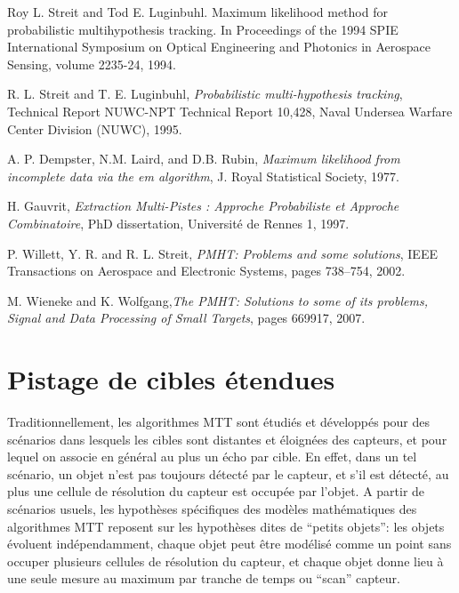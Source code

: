\documentclass[10pt,french,a4paper]{report}
\begin{document}
\begin{thebibliography}{9}
Roy L. Streit and Tod E. Luginbuhl. Maximum likelihood method for probabilistic multihypothesis tracking. In Proceedings of the 1994 SPIE International Symposium on Optical Engineering and Photonics in Aerospace Sensing, volume 2235-24, 1994.

R. L. Streit and T. E. Luginbuhl, \emph{Probabilistic multi-hypothesis tracking}, Technical Report NUWC-NPT Technical Report 10,428, Naval Undersea Warfare Center Division (NUWC), 1995.

A. P. Dempster, N.M. Laird, and D.B. Rubin, \emph{Maximum likelihood from incomplete data via the em algorithm}, J. Royal Statistical Society, 1977.

H. Gauvrit, \emph{Extraction Multi-Pistes : Approche Probabiliste et Approche Combinatoire}, PhD dissertation, Université de Rennes 1, 1997.

P. Willett, Y. R. and R. L. Streit, \emph{PMHT: Problems and some solutions},
IEEE Transactions on Aerospace and Electronic Systems, pages 738--754, 2002.

M. Wieneke and K. Wolfgang,\emph{The PMHT: Solutions to some of its problems, Signal and Data Processing of Small Targets}, pages 669917, 2007.
	 	  \end{thebibliography}


\section{Pistage de cibles étendues}
 
Traditionnellement, les algorithmes \ac{MTT} sont étudiés et développés pour des scénarios dans lesquels les cibles sont distantes et éloignées des capteurs, et pour lequel on associe en général au plus un écho par cible. En effet, dans un tel
scénario, un objet n'est pas toujours détecté par le capteur, et s'il est détecté, au plus une cellule de résolution du capteur est occupée par l'objet. A partir de scénarios usuels, les hypothèses spécifiques
des modèles mathématiques des algorithmes \ac{MTT} reposent sur les hypothèses dites de ``petits objets'': les objets évoluent indépendamment, chaque objet peut être modélisé comme un point sans occuper plusieurs cellules de résolution du capteur, et chaque objet donne lieu à une seule mesure au maximum par tranche de temps ou ``scan'' capteur.
\end{document}
